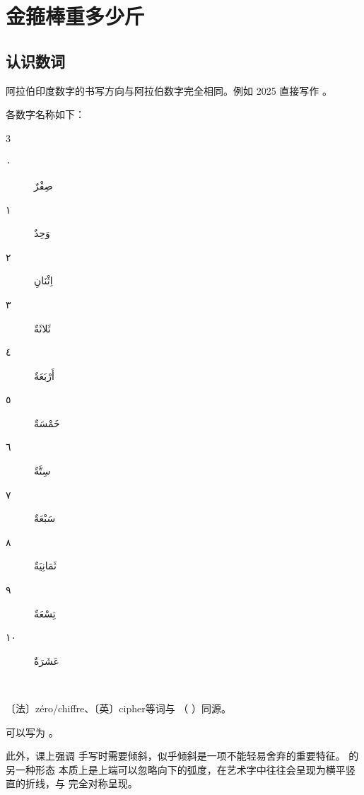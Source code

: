 \chapter{金箍棒重多少斤}

\section{ 认识数词}


阿拉伯印度数字的书写方向与阿拉伯数字完全相同。例如 2025 直接写作 。

各数字名称如下：

\begin{Arabic}
    \begin{multicols}{3}
    \begin{description}
        \item[٠] صِفْرٌ
        \item[١] وَحِدٌ
        \item[٢] اِثْنَانِ
        \item[٣] ثَلاثَةٌ
        \item[٤] أَرْبَعَةٌ
        \item[٥] خَمْسَةٌ
        \item[٦] سِتَّةٌ
        \item[٧] سَبْعَةٌ
        \item[٨] ثَمَانِيَةٌ
        \item[٩] تِسْعَةٌ
        \item[١٠] عَشَرَةٌ
        \item[~] 
    \end{description}
    \end{multicols}
\end{Arabic}

〔法〕zéro/chiffre、〔英〕cipher等词与  （  ）同源。

\newfontfamily{}

\begin{attention}
     可以写为 。
\end{attention}

\begin{note}
    此外，课上强调  手写时需要倾斜，似乎倾斜是一项不能轻易舍弃的重要特征。  的另一种形态  本质上是上端可以忽略向下的弧度，在艺术字中往往会呈现为横平竖直的折线，与  完全对称呈现。
\end{note}

